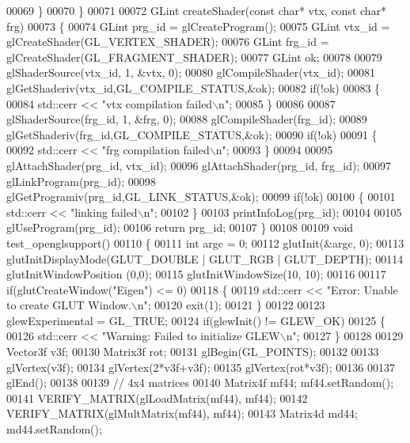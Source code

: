 \begin{DoxyCode}
00069     \}
00070 \}
00071 
00072 GLint createShader(\textcolor{keyword}{const} \textcolor{keywordtype}{char}* vtx, \textcolor{keyword}{const} \textcolor{keywordtype}{char}* frg)
00073 \{
00074   GLint prg\_id = glCreateProgram();
00075   GLint vtx\_id = glCreateShader(GL\_VERTEX\_SHADER);
00076   GLint frg\_id = glCreateShader(GL\_FRAGMENT\_SHADER);
00077   GLint ok;
00078   
00079   glShaderSource(vtx\_id, 1, &vtx, 0);
00080   glCompileShader(vtx\_id);
00081   glGetShaderiv(vtx\_id,GL\_COMPILE\_STATUS,&ok);
00082   \textcolor{keywordflow}{if}(!ok)
00083   \{
00084     std::cerr << \textcolor{stringliteral}{"vtx compilation failed\(\backslash\)n"};
00085   \}
00086   
00087   glShaderSource(frg\_id, 1, &frg, 0);
00088   glCompileShader(frg\_id);
00089   glGetShaderiv(frg\_id,GL\_COMPILE\_STATUS,&ok);
00090   \textcolor{keywordflow}{if}(!ok)
00091   \{
00092     std::cerr << \textcolor{stringliteral}{"frg compilation failed\(\backslash\)n"};
00093   \}
00094   
00095   glAttachShader(prg\_id, vtx\_id);
00096   glAttachShader(prg\_id, frg\_id);
00097   glLinkProgram(prg\_id);
00098   glGetProgramiv(prg\_id,GL\_LINK\_STATUS,&ok);
00099   \textcolor{keywordflow}{if}(!ok)
00100   \{
00101     std::cerr << \textcolor{stringliteral}{"linking failed\(\backslash\)n"};
00102   \}
00103   printInfoLog(prg\_id);
00104   
00105   glUseProgram(prg\_id);
00106   \textcolor{keywordflow}{return} prg\_id;
00107 \}
00108 
00109 \textcolor{keywordtype}{void} test\_openglsupport()
00110 \{
00111   \textcolor{keywordtype}{int} argc = 0;
00112   glutInit(&argc, 0);
00113   glutInitDisplayMode(GLUT\_DOUBLE | GLUT\_RGB | GLUT\_DEPTH);
00114   glutInitWindowPosition (0,0);
00115   glutInitWindowSize(10, 10);
00116 
00117   \textcolor{keywordflow}{if}(glutCreateWindow(\textcolor{stringliteral}{"Eigen"}) <= 0)
00118   \{
00119     std::cerr << \textcolor{stringliteral}{"Error: Unable to create GLUT Window.\(\backslash\)n"};
00120     exit(1);
00121   \}
00122   
00123   glewExperimental = GL\_TRUE;
00124   \textcolor{keywordflow}{if}(glewInit() != GLEW\_OK)
00125   \{
00126     std::cerr << \textcolor{stringliteral}{"Warning: Failed to initialize GLEW\(\backslash\)n"};
00127   \}
00128 
00129   Vector3f v3f;
00130   Matrix3f rot;
00131   glBegin(GL\_POINTS);
00132   
00133   glVertex(v3f);
00134   glVertex(2*v3f+v3f);
00135   glVertex(rot*v3f);
00136   
00137   glEnd();
00138   
00139   \textcolor{comment}{// 4x4 matrices}
00140   Matrix4f mf44; mf44.setRandom();
00141   VERIFY\_MATRIX(glLoadMatrix(mf44), mf44);
00142   VERIFY\_MATRIX(glMultMatrix(mf44), mf44);
00143   Matrix4d md44; md44.setRandom();

\end{DoxyCode}
